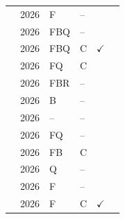 \begin{longtable}{@{}llllcc@{}}
\cite{mpadmavathimrojashravanibvankitharameshkumarkr2026powered} & 2026 & F & -- &  &  \\
\cite{muthulakshmim2026smart} & 2026 & FBQ & -- &  &  \\
\cite{n2026smart} & 2026 & FBQ & C & $\checkmark$ &  \\
\cite{omkargawde2026planner} & 2026 & FQ & C &  &  \\
\cite{p2026geofenced} & 2026 & FBR & -- &  &  \\
\cite{prabinkumardas2026code} & 2026 & B & -- &  &  \\
\cite{purnomo2026penilaian} & 2026 & -- & -- &  &  \\
\cite{revanthd2026attendify} & 2026 & FQ & -- &  &  \\
\cite{satrani2026implementation} & 2026 & FB & C &  &  \\
\cite{tejasbr2026geoattend} & 2026 & Q & -- &  &  \\
\cite{wadhe2026smart} & 2026 & F & -- &  &  \\
\cite{wirana2026implementation} & 2026 & F & C & $\checkmark$ &  \\
\bottomrule\end{longtable}
